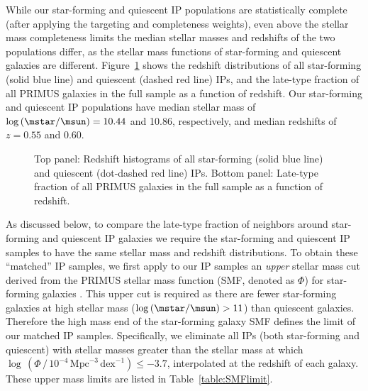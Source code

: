 While our star-forming and quiescent IP populations are statistically complete (after applying the targeting and completeness weights), even above the stellar mass completeness limits the median stellar masses and redshifts of the two populations differ, as the stellar mass functions of star-forming and quiescent galaxies are different.
Figure~\ref{fig:IPhist_latefrac_vs_z} shows the redshift distributions of all star-forming (solid blue line) and quiescent (dashed red line) IPs, and the late-type fraction of all PRIMUS galaxies in the full sample as a function of redshift.
Our star-forming and quiescent IP populations have median stellar mass of $\log\,(\mstar/\msun)=10.44$ and 10.86, respectively, and median redshifts of $z=0.55$ and 0.60.

\begin{figure}
  \epstrim{0.1in 0.1in 0.5in 0.8in}
  \caption{Top panel: Redshift histograms of all star-forming (solid blue line) and quiescent (dot-dashed red line) IPs.
Bottom panel: Late-type fraction of all PRIMUS galaxies in the full sample as a function of redshift. 
}
  \label{fig:IPhist_latefrac_vs_z}
\end{figure}

As discussed below, to compare the late-type fraction of neighbors around star-forming and quiescent IP galaxies we require the star-forming and quiescent IP samples to have the same stellar mass and redshift distributions.
To obtain these ``matched'' IP samples, we first apply to our IP samples an {\it upper} stellar mass cut derived from the PRIMUS stellar mass function (SMF, denoted as $\Phi$) for star-forming galaxies \citep{Moustakas13}.
This upper cut is required as there are fewer star-forming galaxies at high stellar mass ($\log\,(\mstar/\msun)>11$) than quiescent galaxies.
Therefore the high mass end of the star-forming galaxy SMF defines the limit of our matched IP samples.  
Specifically, we eliminate all IPs (both star-forming and quiescent) with stellar masses greater than the stellar mass at which 
${\log\,(\Phi \,/\, 10^{-4}\,\text{Mpc}^{-3}\,\text{dex}^{-1}) \le -3.7}$, interpolated at the redshift of each galaxy.
These upper mass limits are listed in Table~\ref{table:SMFlimit}.



